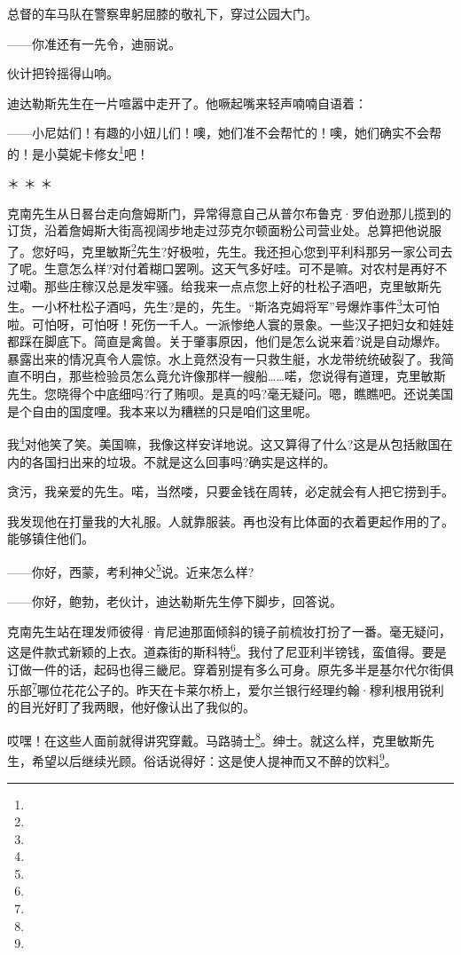 \par 总督的车马队在警察卑躬屈膝的敬礼下，穿过公园大门。
\par ——你准还有一先令，迪丽说。
\par 伙计把铃摇得山响。
\par 迪达勒斯先生在一片喧嚣中走开了。他噘起嘴来轻声喃喃自语着：
\par ——小尼姑们！有趣的小妞儿们！噢，她们准不会帮忙的！噢，她们确实不会帮的！是小莫妮卡修女\footnote{}吧！
\par ＊ ＊ ＊
\par 克南先生从日晷台走向詹姆斯门，异常得意自己从普尔布鲁克·罗伯逊那儿揽到的订货，沿着詹姆斯大街高视阔步地走过莎克尔顿面粉公司营业处。总算把他说服了。您好吗，克里敏斯\footnote{}先生?好极啦，先生。我还担心您到平利科那另一家公司去了呢。生意怎么样?对付着糊口罢咧。这天气多好哇。可不是嘛。对农村是再好不过嘞。那些庄稼汉总是发牢骚。给我来一点点您上好的杜松子酒吧，克里敏斯先生。一小杯杜松子酒吗，先生?是的，先生。“斯洛克姆将军”号爆炸事件\footnote{}太可怕啦。可怕呀，可怕呀！死伤一千人。一派惨绝人寰的景象。一些汉子把妇女和娃娃都踩在脚底下。简直是禽兽。关于肇事原因，他们是怎么说来着?说是自动爆炸。暴露出来的情况真令人震惊。水上竟然没有一只救生艇，水龙带统统破裂了。我简直不明白，那些检验员怎么竟允许像那样一艘船……喏，您说得有道理，克里敏斯先生。您晓得个中底细吗?行了贿呗。是真的吗?毫无疑问。嗯，瞧瞧吧。还说美国是个自由的国度哩。我本来以为糟糕的只是咱们这里呢。
\par 我\footnote{}对他笑了笑。美国嘛，我像这样安详地说。这又算得了什么?这是从包括敝国在内的各国扫出来的垃圾。不就是这么回事吗?确实是这样的。
\par 贪污，我亲爱的先生。喏，当然喽，只要金钱在周转，必定就会有人把它捞到手。
\par 我发现他在打量我的大礼服。人就靠服装。再也没有比体面的衣着更起作用的了。能够镇住他们。
\par ——你好，西蒙，考利神父\footnote{}说。近来怎么样?
\par ——你好，鲍勃，老伙计，迪达勒斯先生停下脚步，回答说。
\par 克南先生站在理发师彼得·肯尼迪那面倾斜的镜子前梳妆打扮了一番。毫无疑问，这是件款式新颖的上衣。道森街的斯科特\footnote{}。我付了尼亚利半镑钱，蛮值得。要是订做一件的话，起码也得三畿尼。穿着别提有多么可身。原先多半是基尔代尔街俱乐部\footnote{}哪位花花公子的。昨天在卡莱尔桥上，爱尔兰银行经理约翰·穆利根用锐利的目光好盯了我两眼，他好像认出了我似的。
\par 哎嘿！在这些人面前就得讲究穿戴。马路骑士\footnote{}。绅士。就这么样，克里敏斯先生，希望以后继续光顾。俗话说得好：这是使人提神而又不醉的饮料\footnote{}。
